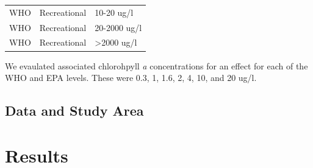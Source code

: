 \documentclass[11pt,]{article}
\begin{document}
\begin{longtable}[c]{@{}lll@{}}
\begin{minipage}[t]{0.11\columnwidth}\raggedright\strut
WHO
\strut\end{minipage} &
\begin{minipage}[t]{0.16\columnwidth}\raggedright\strut
Recreational
\strut\end{minipage} &
\begin{minipage}[t]{0.19\columnwidth}\raggedright\strut
10-20 ug/l
\strut\end{minipage}\tabularnewline
\begin{minipage}[t]{0.11\columnwidth}\raggedright\strut
WHO
\strut\end{minipage} &
\begin{minipage}[t]{0.16\columnwidth}\raggedright\strut
Recreational
\strut\end{minipage} &
\begin{minipage}[t]{0.19\columnwidth}\raggedright\strut
20-2000 ug/l
\strut\end{minipage}\tabularnewline
\begin{minipage}[t]{0.11\columnwidth}\raggedright\strut
WHO
\strut\end{minipage} &
\begin{minipage}[t]{0.16\columnwidth}\raggedright\strut
Recreational
\strut\end{minipage} &
\begin{minipage}[t]{0.19\columnwidth}\raggedright\strut
\textgreater{}2000 ug/l
\strut\end{minipage}\tabularnewline
\bottomrule
\end{longtable}

We evaulated associated chlorohpyll \emph{a} concentrations for an
effect for each of the WHO and EPA levels. These were 0.3, 1, 1.6, 2, 4,
10, and 20 ug/l.

\subsection{Data and Study Area}\label{data-and-study-area}

\section{Results}\label{results}
\end{document}

